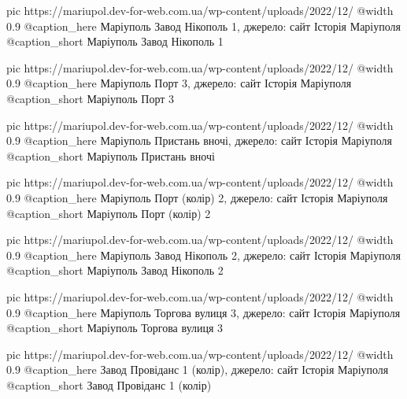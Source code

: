   pic https://mariupol.dev-for-web.com.ua/wp-content/uploads/2022/12/%
  @width 0.9
  @caption_here Маріуполь Завод Нікополь 1, джерело: сайт Історія Маріуполя
  @caption_short Маріуполь Завод Нікополь 1

  pic https://mariupol.dev-for-web.com.ua/wp-content/uploads/2022/12/%
  @width 0.9
  @caption_here Маріуполь Порт 3, джерело: сайт Історія Маріуполя
  @caption_short Маріуполь Порт 3

  pic https://mariupol.dev-for-web.com.ua/wp-content/uploads/2022/12/%
  @width 0.9
  @caption_here Маріуполь Пристань вночі, джерело: сайт Історія Маріуполя
  @caption_short Маріуполь Пристань вночі

  pic https://mariupol.dev-for-web.com.ua/wp-content/uploads/2022/12/%
  @width 0.9
  @caption_here Маріуполь Порт (колір) 2, джерело: сайт Історія Маріуполя
  @caption_short Маріуполь Порт (колір) 2

  pic https://mariupol.dev-for-web.com.ua/wp-content/uploads/2022/12/%
  @width 0.9
  @caption_here Маріуполь Завод Нікополь 2, джерело: сайт Історія Маріуполя
  @caption_short Маріуполь Завод Нікополь 2

  pic https://mariupol.dev-for-web.com.ua/wp-content/uploads/2022/12/%
  @width 0.9
  @caption_here Маріуполь Торгова вулиця 3, джерело: сайт Історія Маріуполя
  @caption_short Маріуполь Торгова вулиця 3

  pic https://mariupol.dev-for-web.com.ua/wp-content/uploads/2022/12/%
  @width 0.9
  @caption_here Завод Провіданс 1 (колір), джерело: сайт Історія Маріуполя
  @caption_short Завод Провіданс 1 (колір)

